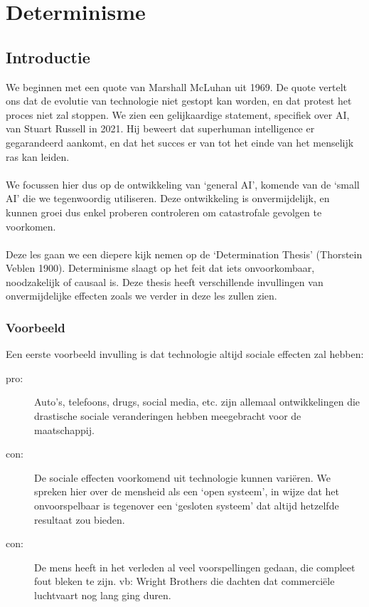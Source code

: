 \documentclass[../summary.tex]{subfiles}
\begin{document}
	\section{Determinisme}
	\subsection{Introductie}
	We beginnen met een quote van Marshall McLuhan uit 1969. De quote vertelt ons dat de evolutie van technologie niet gestopt kan worden, en dat protest het proces niet zal stoppen. We zien een gelijkaardige statement, specifiek over AI, van Stuart Russell in 2021. Hij beweert dat superhuman intelligence er gegarandeerd aankomt, en dat het succes er van tot het einde van het menselijk ras kan leiden.  \\
	\\
	We focussen hier dus op de ontwikkeling van `general AI', komende van de `small AI' die we tegenwoordig utiliseren. Deze ontwikkeling is onvermijdelijk, en kunnen groei dus enkel proberen controleren om catastrofale gevolgen te voorkomen. \\
	\\	
	Deze les gaan we een diepere kijk nemen op de `Determination Thesis' (Thorstein Veblen 1900). Determinisme slaagt op het feit dat iets onvoorkombaar, noodzakelijk of causaal is. Deze thesis heeft verschillende invullingen van onvermijdelijke effecten zoals we verder in deze les zullen zien.  \\
	
	\subsubsection{Voorbeeld}
	Een eerste voorbeeld invulling is dat technologie altijd sociale effecten zal hebben:
	\begin{description}
		\item[pro:] Auto's, telefoons, drugs, social media, etc. zijn allemaal ontwikkelingen die drastische sociale veranderingen hebben meegebracht voor de maatschappij.
		\item[con:] De sociale effecten voorkomend uit technologie kunnen variëren. We spreken hier over de mensheid als een `open systeem', in wijze dat het onvoorspelbaar is tegenover een `gesloten systeem' dat altijd hetzelfde resultaat zou bieden.
		\item[con:]  De mens heeft in het verleden al veel voorspellingen gedaan, die compleet fout bleken te zijn. vb: Wright Brothers die dachten dat commerciële luchtvaart nog lang ging duren.
	\end{description}
	
\end{document}
